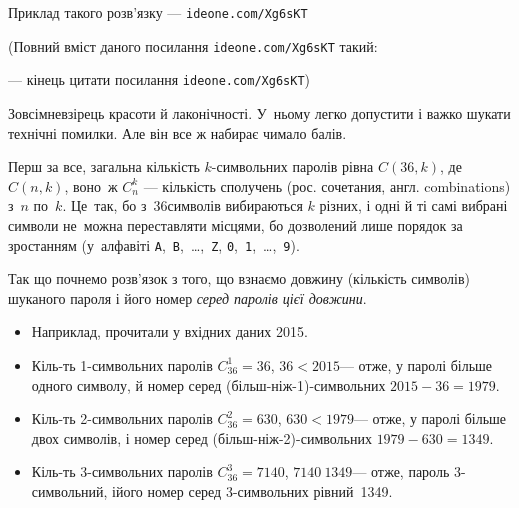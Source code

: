 \documentclass[14pt,a4paper]{extarticle}
\renewcommand{\baselinestretch}{1.3125}
\begin{document}
Приклад такого розв’язку --- 
\verb"ideone.com/Xg6sKT"


{\color{green}\begin{small}

\renewcommand{\baselinestretch}{0.875}

(Повний вміст даного посилання \verb"ideone.com/Xg6sKT" такий:

--- кінець цитати посилання \verb"ideone.com/Xg6sKT")

\end{small}}


\hspace{1em plus 1em}%
Зовсім\nolinebreak[2] не\nolinebreak[3] взірець красоти й лаконічності. У~ньому легко допустити і важко шукати технічні помилки. Але він все ж набирає чимало балів.

Перш за все, загальна кількість $k$-сим\-воль\-них паролів рівна $C(36, k)$, де $C(n,k)$, воно~ж $C_n^k$ --- кількість сполучень (рос. сочетания, англ. combinations) з~$n$ по~$k$. Це~так, бо з~36\nolinebreak[3] символів вибираються $k$ різних, і одні й ті самі вибрані символи не~можна переставляти місцями, бо дозволений лише порядок за зростанням (у~алфавіті \texttt{A},~\texttt{B},~\dots,~\texttt{Z}, \texttt{0},~\texttt{1},~\dots,~\texttt{9}).

Так що почнемо розв’язок з того, що взнаємо довжину (кількість символів) шуканого пароля і його номер \emph{серед паролів цієї довжини}.

\begin{small}
\begin{itemize}
\item[] Наприклад, прочитали у вхідних даних 2015.

\item Кіль-ть 1-символьних паролів ${C_{36}^1{=}36}$,\hspace{0.5em plus 1em} ${36{<}2015}$\nolinebreak[3] --- отже, у паролі більше одного символу, й номер серед (більш-ніж-1)-символьних ${2015-36=1979}$.

\item Кіль-ть 2-символьних паролів ${C_{36}^2{=}630}$,\hspace{0.5em plus 1em} ${630{<}1979}$\nolinebreak[3] --- отже, у паролі більше двох символів, і номер серед (більш-ніж-2)-символьних ${1979-630=1349}$.

\item Кіль-ть 3-символьних паролів ${C_{36}^3{=}7140}$,\hspace{0.5em plus 1em} ${7140{\>}1349}$\nolinebreak[3] --- отже, пароль 3-символьний, і\nolinebreak[3] його номер серед 3-символьних рівний~1349.

\end{itemize}
\end{small}
\end{document}
